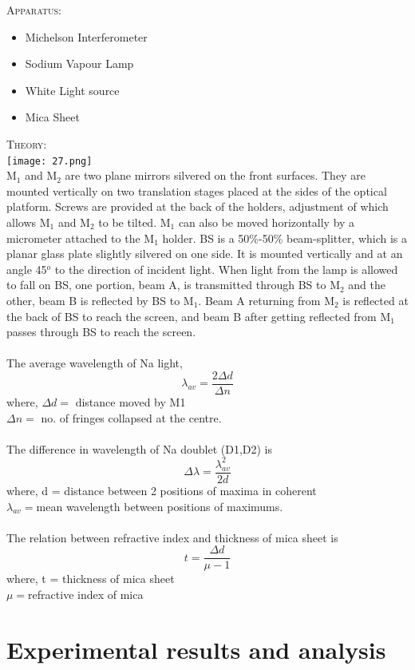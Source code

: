 \documentclass[12pt]{report}
\begin{document}
	\textsc{\large{Apparatus: }}
	\begin{itemize}
		\item Michelson Interferometer
		\item Sodium Vapour Lamp
		\item White Light source
		\item Mica Sheet 
	\end{itemize}
	\textsc{\large{Theory:}}
	\\
	\texttt{[image: 27.png]}\\
	M$_1$ and M$_2$ are two plane mirrors silvered on the front surfaces. They are mounted vertically on two translation stages placed at the sides of the optical platform. Screws are provided at the back of the holders, adjustment of which allows M$_1$ and M$_2$ to be tilted. M$_1$ can also be moved horizontally by a micrometer attached to the M$_1$ holder. BS is a 50\%-50\% beam-splitter, which is a planar glass plate slightly silvered on one side. It is mounted vertically and at an angle 45$^o$ to the direction of incident light. When light from the lamp is allowed to fall on BS, one portion, beam A, is transmitted through BS to M$_2$ and the other, beam B is reflected by BS to M$_1$. Beam A returning from M$_2$ is reflected at the back of BS to reach the screen, and beam B after getting reflected from M$_1$ passes through BS to reach the screen.\\\\
	The average wavelength of Na light,
	$$ \lambda_{av} = \frac{2\Delta d}{\Delta n} $$
	where, $\Delta d = $ distance moved by M1\\
	\qquad $\Delta n = $ no. of fringes collapsed at the centre.\\\\
	The difference in wavelength of Na doublet (D1,D2) is
	$$ \Delta \lambda = \frac{\lambda^2_{av}}{2d}$$
	where, d = distance between 2 positions of maxima in coherent\\
	\qquad $\lambda_{av} =  $mean wavelength between positions of maximums.\\\\
	The relation between refractive index and thickness of mica sheet is
	$$ t = \frac{\Delta d}{\mu - 1}$$
	where, t = thickness of mica sheet\\
	\qquad $\mu = $refractive index of mica
	
	\chapter{Experimental results and analysis}
	
\end{document}
